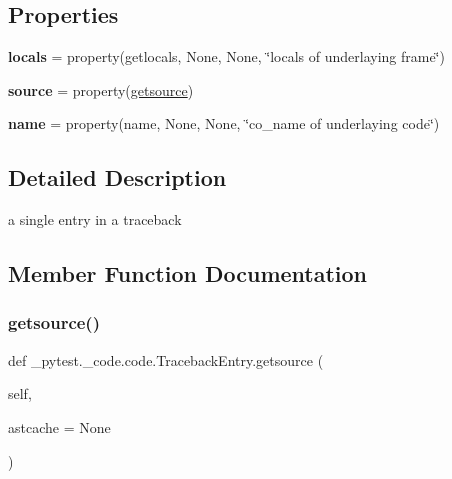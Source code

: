 \subsection*{Properties}
\begin{DoxyCompactItemize}
\item 
\mbox{\label{class__pytest_1_1__code_1_1code_1_1_traceback_entry_a0e9f2a7ed3599c30f9a095008c8e7135}} 
{\bfseries locals} = property(getlocals, None, None, \char`\"{}locals of underlaying frame\char`\"{})
\item 
\mbox{\label{class__pytest_1_1__code_1_1code_1_1_traceback_entry_a96d7de3a2cf3e32d2aa193f64f217fd4}} 
{\bfseries source} = property(\hyperlink{class__pytest_1_1__code_1_1code_1_1_traceback_entry_a9084b17e96372ff93cfe7f7fadccf6ad}{getsource})
\item 
\mbox{\label{class__pytest_1_1__code_1_1code_1_1_traceback_entry_a60ae56d146d82c7299755cbff55b260d}} 
{\bfseries name} = property(name, None, None, \char`\"{}co\+\_\+name of underlaying code\char`\"{})
\end{DoxyCompactItemize}


\subsection{Detailed Description}
\begin{DoxyVerb}a single entry in a traceback \end{DoxyVerb}
 

\subsection{Member Function Documentation}
\mbox{\label{class__pytest_1_1__code_1_1code_1_1_traceback_entry_a9084b17e96372ff93cfe7f7fadccf6ad}} 
\subsubsection{\texorpdfstring{getsource()}{getsource()}}
{\footnotesize\ttfamily def \+\_\+pytest.\+\_\+code.\+code.\+Traceback\+Entry.\+getsource (\begin{DoxyParamCaption}\item[{}]{self,  }\item[{}]{astcache = {\ttfamily None} }\end{DoxyParamCaption})}

